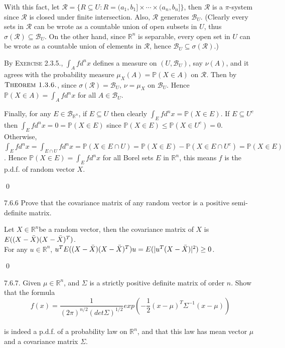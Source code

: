 \begin{answer}
With this fact, let $\mathcal{R}=\{R\subseteq U:R=(a_1,b_1]\times\cdots\times(a_n,b_n]\}$, then $\mathcal{R}$ is a $\pi$-system since $\mathcal{R}$ is closed under finite intersection. Also, $\mathcal{R}$ generates $\mathcal{B}_U$. (Clearly every sets in $\mathcal{R}$ can be wrote as a countable union of open subsets in $U$, thus $\sigma(\mathcal{R})\subseteq\mathcal{B}_U$. On the other hand, since $\mathbb{R}^n$ is separable, every open set in $U$ can be wrote as a countable union of elements in $\mathcal{R}$, hence $\mathcal{B}_U\subseteq\sigma(\mathcal{R})$.)

By \textsc{Exercise 2.3.5.}, $\int_Afd^nx$ defines a measure on $(U,\mathcal{B}_U)$, say $\nu(A)$, and it agrees with the probability measure $\mu_X(A)=\mathbb{P}(X\in A)$ on $\mathcal{R}$. Then by $\textsc{Theorem 1.3.6.}$, since $\sigma(\mathcal{R})=\mathcal{B}_U$, $\nu=\mu_X$ on $\mathcal{B}_U$. Hence $\mathbb{P}(X\in A)=\int_Afd^nx$ for all $A\in\mathcal{B}_U$.

Finally, for any $E\in\mathcal{B}_{\mathbb{R}^n}$, if $E\subseteq U$ then clearly $\int_Efd^nx=\mathbb{P}(X\in E)$. If $E\subseteq U^c$ then $\int_Efd^nx=0=\mathbb{P}(X\in E)$ since $\mathbb{P}(X\in E)\leq\mathbb{P}(X\in U^c)=0$. Otherwise, $\int_Efd^nx=\int_{E\cap U}fd^nx=\mathbb{P}(X\in E\cap U)=\mathbb{P}(X\in E)-\mathbb{P}(X\in E\cap U^c)=\mathbb{P}(X\in E)$. Hence $\mathbb{P}(X\in E)=\int_Efd^nx$ for all Borel sets $E$ in $\mathbb{R}^n$, this means $f$ is the p.d.f. of random vector $X$. 
\end{answer} \qed \qquad

\begin{exercise}7.6.6
Prove that the covariance matrix of any random vector is a positive semi-definite matrix.
\begin{answer}
Let $X \in \mathbb{R}^n $be a random vector, then the covariance matrix of $X$ is $E((X - \Bar{X})(X-\Bar{X})^T)$.
\\For any $u \in \mathbb{R}^n$, $u^TE((X - \Bar{X})(X-\Bar{X})^T)u = E(| u^T(X-\Bar{X})|^2)\geq 0$.
\end{answer}
\qed \qquad
\end{exercise}
\begin{exercise}7.6.7. 
Given $\mu \in \mathbb{R}^n$, and $\Sigma$ is a strictly positive definite matrix of order $n$. Show that the formula
\begin{equation*}
    f(x) = \frac{1}{(2 \pi )^{n/2}(det \Sigma)^{1/2}} exp(-\frac{1}{2}(x-\mu)^T \Sigma^{-1} (x-\mu))
\end{equation*}
\\ is indeed a p.d.f. of a probability law on $\mathbb{R}^{n}$, and that this law has mean vector $\mu$ and a covariance matrix  $\Sigma$.\\
\end{exercise}

